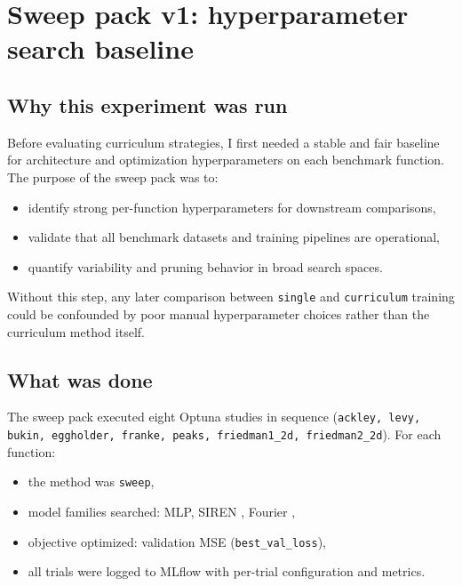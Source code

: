 \chapter{Sweep pack v1: hyperparameter search baseline}
\label{app:sweep-pack-v1}

\section{Why this experiment was run}

Before evaluating curriculum strategies, I first needed a stable and fair baseline
for architecture and optimization hyperparameters on each benchmark function.
The purpose of the sweep pack was to:

\begin{itemize}
    \item identify strong per-function hyperparameters for downstream comparisons,
    \item validate that all benchmark datasets and training pipelines are operational,
    \item quantify variability and pruning behavior in broad search spaces.
\end{itemize}

Without this step, any later comparison between \texttt{single} and
\texttt{curriculum} training could be confounded by poor manual hyperparameter
choices rather than the curriculum method itself.

\section{What was done}

The sweep pack executed eight Optuna \cite{akiba2019optuna} studies in
sequence (\texttt{ackley, levy, bukin, eggholder, franke, peaks,
friedman1\_2d, friedman2\_2d}). For each function:

\begin{itemize}
    \item the method was \texttt{sweep},
    \item model families searched: MLP, SIREN \cite{sitzmann2020implicit}, Fourier
          \cite{tancik2020fourier},
    \item objective optimized: validation MSE (\texttt{best\_val\_loss}),
    \item all trials were logged to MLflow \cite{zaharia2018accelerating} with
          per-trial configuration and metrics.
\end{itemize}

